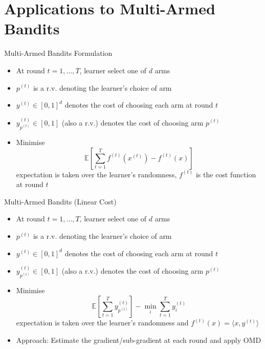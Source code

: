 \section{Applications to Multi-Armed Bandits}

\begin{frame}{Multi-Armed Bandits Formulation}
    \begin{itemize}
        \item At round $t = 1, \dots, T$, learner select one of $d$ arms \pause
        \item $p^{(t)}$ is a r.v. denoting the learner's choice of arm \pause
        \item $y^{(t)} \in [0, 1]^d$ denotes the cost of choosing each arm at round $t$ \pause
        \item $y^{(t)}_{p^{(t)}} \in [0, 1]$ (also a r.v.) denotes the cost of choosing arm $p^{(t)}$ \pause
        \item Minimise $$ \mathbb{E}\left[\sum_{t=1}^T f^{(t)}(x^{(t)}) - f^{(t)}(x) \right] $$
        expectation is taken over the learner's randomness, $f^{(t)}$ is the cost function at round $t$
    \end{itemize}
\end{frame}

\begin{frame}{Multi-Armed Bandits (Linear Cost)}
    \begin{itemize}
        \item At round $t = 1, \dots, T$, learner select one of $d$ arms 
        \item $p^{(t)}$ is a r.v. denoting the learner's choice of arm
        \item $y^{(t)} \in [0, 1]^d$ denotes the cost of choosing each arm at round $t$
        \item $y^{(t)}_{p^{(t)}} \in [0, 1]$ (also a r.v.) denotes the cost of choosing arm $p^{(t)}$
        \item Minimise $$ \mathbb{E}\left[ \sum_{t=1}^T y^{(t)}_{p^{(t)}}\right] - \min_{i} \sum_{t=1}^T y^{(t)}_i $$
        expectation is taken over the learner's randomness and $f^{(t)}(x) = \langle x, y^{(t)} \rangle$ \pause
        \item Approach: Estimate the gradient/sub-gradient at each round and apply OMD
    \end{itemize}
\end{frame}


